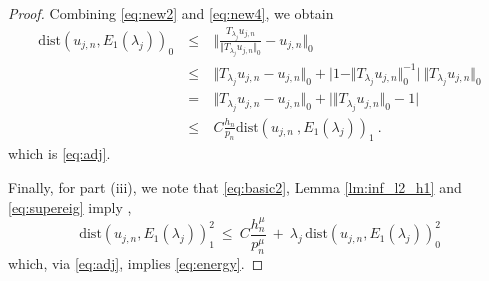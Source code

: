 \documentclass[preprint ,12pt]{elsarticle}
\begin{document}
\begin{proof}
Combining \eqref{eq:new2} and  \eqref{eq:new4},  we obtain
\begin{eqnarray*} 
\mathrm{dist}(u_{j,n}, E_1(\lambda_j))_0 \ & \leq & \ 
\bigg\Vert \frac{T_{\lambda_j}u_{j, n}}{\Vert T_{\lambda_j}u_{j, n}\Vert_0} - u_{j, n}
  \bigg\Vert_0 \\
& \leq & \ 
\bigg\Vert {T_{\lambda_j}u_{j, n}} - u_{j, n}
  \bigg\Vert_0 + \bigg\vert 1 - \Vert T_{\lambda_j}u_{j,n}\Vert_0^{-1}\bigg\vert  \ \Vert T_{\lambda_j}u_{j,n}\Vert_0\\
& =  & \ 
\bigg\Vert {T_{\lambda_j}u_{j, n}} - u_{j, n}
  \bigg\Vert_0 + \bigg\vert  \Vert T_{\lambda_j}u_{j,n}\Vert_0 - 1 \bigg\vert 
\\
& \leq & \ C \frac{h_n}{p_n} \mathrm{dist} (u_{j,n} \ ,
E_1(\lambda_j))_1 \ .
\end{eqnarray*}
which is \eqref{eq:adj}. 

Finally,  for part (iii),  we note that 
\eqref{eq:basic2},  Lemma \ref{lm:inf_l2_h1} and  \eqref{eq:supereig}
imply ,
\begin{equation}
\mathrm{dist}(u_{j,n}, E_1(\lambda_j))_1^2 \ \leq\  C
\frac{h_n^{\mu}}{p_n^{\mu}} \ + \ \lambda_j\,  \mathrm{dist}(u_{j,n}, E_1(\lambda_j))_0^2
\end{equation}
which, via \eqref{eq:adj}, implies  \eqref{eq:energy}.


\end{proof}



\end{document}

